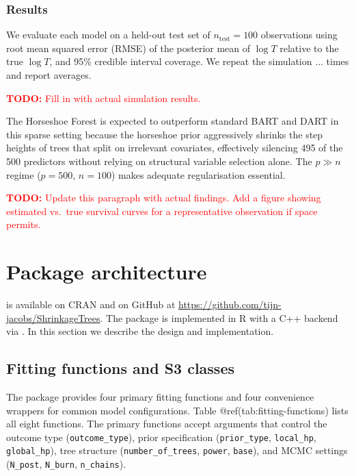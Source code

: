 \subsubsection{Results}\label{results}

We evaluate each model on a held-out test set of \(n_{\text{test}} = 100\) observations using root mean squared error (RMSE) of the posterior mean of \(\log T\) relative to the true \(\log T\), and 95\% credible interval coverage. We repeat the simulation \(\ldots\) times and report averages.

\textcolor{red}{\textbf{TODO:} Fill in with actual simulation results.}

The Horseshoe Forest is expected to outperform standard BART and DART in this sparse setting because the horseshoe prior aggressively shrinks the step heights of trees that split on irrelevant covariates, effectively silencing 495 of the 500 predictors without relying on structural variable selection alone. The \(p \gg n\) regime (\(p = 500\), \(n = 100\)) makes adequate regularisation essential.

\textcolor{red}{\textbf{TODO:} Update this paragraph with actual findings. Add a figure showing estimated vs.\ true survival curves for a representative observation if space permits.}

\section{Package architecture}\label{package-architecture}

 is available on CRAN and on GitHub at \url{https://github.com/tijn-jacobs/ShrinkageTrees}. The package is implemented in R with a C++ backend via  \citep{eddelbuettel2011rcpp}. In this section we describe the design and implementation.

\subsection{Fitting functions and S3 classes}\label{fitting-functions-and-s3-classes}

The package provides four primary fitting functions and four convenience wrappers for common model configurations. Table @ref(tab:fitting-functions) lists all eight functions. The primary functions accept arguments that control the outcome type (\texttt{outcome\_type}), prior specification (\texttt{prior\_type}, \texttt{local\_hp}, \texttt{global\_hp}), tree structure (\texttt{number\_of\_trees}, \texttt{power}, \texttt{base}), and MCMC settings (\texttt{N\_post}, \texttt{N\_burn}, \texttt{n\_chains}).

